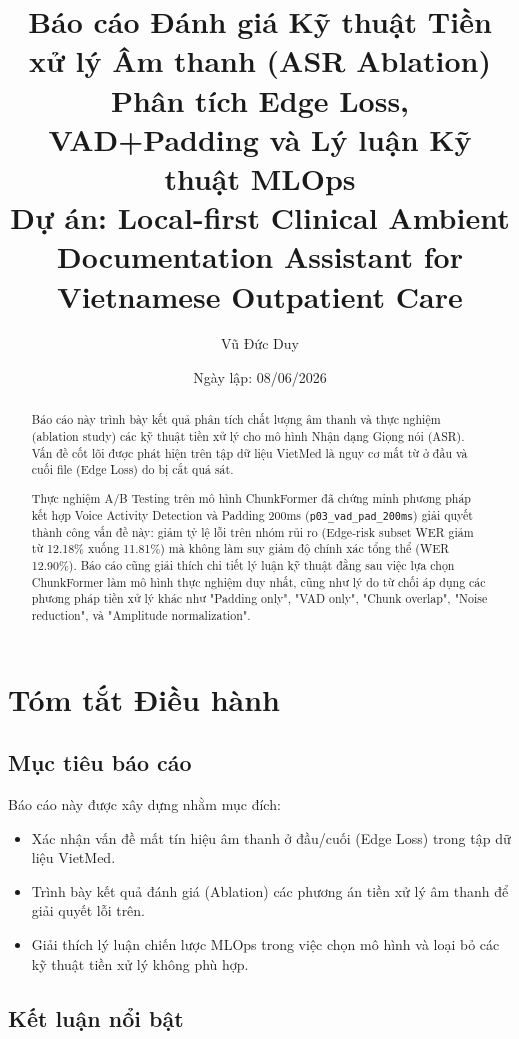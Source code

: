 \documentclass[12pt,a4paper]{article}
\title{
    \textbf{Báo cáo Đánh giá Kỹ thuật Tiền xử lý Âm thanh (ASR Ablation)}\\
    \large Phân tích Edge Loss, VAD+Padding và Lý luận Kỹ thuật MLOps\\
    \normalsize Dự án: Local-first Clinical Ambient Documentation Assistant for Vietnamese Outpatient Care
}
\author{Vũ Đức Duy}
\date{Ngày lập: 08/06/2026}
\begin{document}
\maketitle

\begin{abstract}
Báo cáo này trình bày kết quả phân tích chất lượng âm thanh và thực nghiệm (ablation study) các kỹ thuật tiền xử lý cho mô hình Nhận dạng Giọng nói (ASR). Vấn đề cốt lõi được phát hiện trên tập dữ liệu VietMed là nguy cơ mất từ ở đầu và cuối file (Edge Loss) do bị cắt quá sát. 

Thực nghiệm A/B Testing trên mô hình ChunkFormer đã chứng minh phương pháp kết hợp Voice Activity Detection và Padding 200ms (\texttt{p03\_vad\_pad\_200ms}) giải quyết thành công vấn đề này: giảm tỷ lệ lỗi trên nhóm rủi ro (Edge-risk subset WER giảm từ 12.18\% xuống 11.81\%) mà không làm suy giảm độ chính xác tổng thể (WER 12.90\%). Báo cáo cũng giải thích chi tiết lý luận kỹ thuật đằng sau việc lựa chọn ChunkFormer làm mô hình thực nghiệm duy nhất, cũng như lý do từ chối áp dụng các phương pháp tiền xử lý khác như "Padding only", "VAD only", "Chunk overlap", "Noise reduction", và "Amplitude normalization".
\end{abstract}

\tableofcontents
\newpage

\section{Tóm tắt Điều hành}

\subsection{Mục tiêu báo cáo}
Báo cáo này được xây dựng nhằm mục đích:
\begin{itemize}[leftmargin=1.2cm]
    \item Xác nhận vấn đề mất tín hiệu âm thanh ở đầu/cuối (Edge Loss) trong tập dữ liệu VietMed.
    \item Trình bày kết quả đánh giá (Ablation) các phương án tiền xử lý âm thanh để giải quyết lỗi trên.
    \item Giải thích lý luận chiến lược MLOps trong việc chọn mô hình và loại bỏ các kỹ thuật tiền xử lý không phù hợp.
\end{itemize}

\subsection{Kết luận nổi bật}
\end{document}
